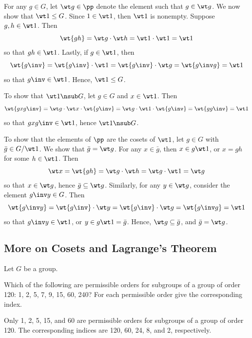 \begin{sol}
    For any $g \in G$, let $\wt g \in \pp$ denote the element such that $g \in \wt g$. We now show that $\wt 1 \leq G$. Since $1 \in \wt 1$, then $\wt 1$ is nonempty. Suppose $g, h \in \wt 1$. Then
    \[\wt{gh} = \wt g \cdot \wt h = \wt 1 \cdot \wt 1 = \wt 1\]
    so that $gh \in \wt 1$. Lastly, if $g \in \wt 1$, then
    \[\wt{g\inv} = \wt{g\inv} \cdot \wt 1 = \wt{g\inv} \cdot \wt g = \wt{g\inv g} = \wt 1\]
    so that $g\inv \in \wt 1$. Hence, $\wt 1 \leq G$.

    To show that $\wt 1 \nsub G$, let $g \in G$ and $x \in \wt 1$. Then
    \[\wt{gxg\inv} = \wt g \cdot \wt x \cdot \wt{g\inv} = \wt g \cdot \wt 1 \cdot \wt{g\inv} = \wt{gg\inv} = \wt 1\]
    so that $gxg\inv \in \wt 1$, hence $\wt 1 \nsub G$.

    To show that the elements of $\pp$ are the cosets of $\wt 1$, let $g \in G$ with $\bar g \in G/\wt 1$. We show that $\bar g = \wt g$. For any $x \in \bar g$, then $x \in g\wt 1$, or $x = gh$ for some $h \in \wt 1$. Then
    \[\wt x = \wt{gh} = \wt g \cdot \wt h = \wt g \cdot \wt 1 = \wt g\]
    so that $x \in \wt g$, hence $\bar g \subseteq \wt g$. Similarly, for any $y \in \wt g$, consider the element $g\inv y \in G$. Then
    \[\wt{g\inv y} = \wt{g\inv} \cdot \wt y = \wt{g\inv} \cdot \wt g = \wt{g\inv g} = \wt 1\]
    so that $g\inv y \in \wt 1$, or $y \in g\wt 1 = \bar g$. Hence, $\wt g \subseteq \bar g$, and $\bar g = \wt g$.
\end{sol}

\newpage

\subsection{More on Cosets and Lagrange's Theorem}

Let $G$ be a group.

\begin{exercise}\label{ex3.2.1}
    Which of the following are permissible orders for subgroups of a group of order 120: 1, 2, 5, 7, 9, 15, 60, 240? For each permissible order give the corresponding index.
\end{exercise}

\begin{sol}
    Only 1, 2, 5, 15, and 60 are permissible orders for subgroups of a group of order 120. The corresponding indices are 120, 60, 24, 8, and 2, respectively.
\end{sol}

